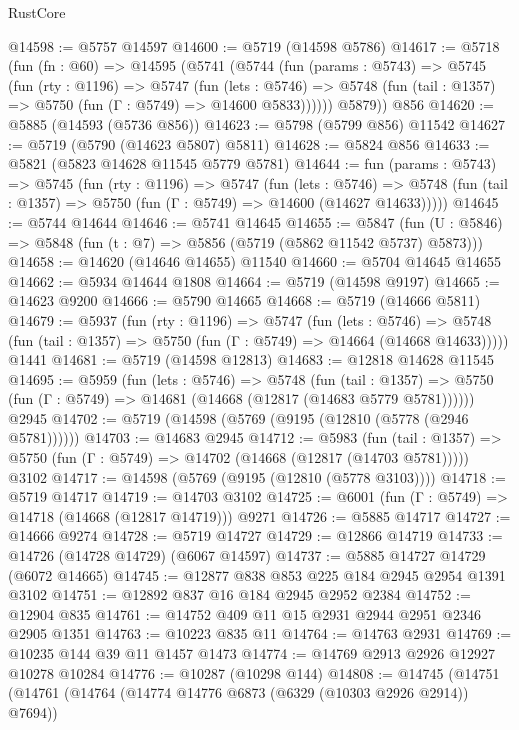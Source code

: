 \begin{lexlean}{RustCore}
\begin{coremodule}
@14598 := @5757 @14597
@14600 := @5719 (@14598 @5786)
@14617 := @5718
    (fun (fn : @60) =>
    @14595
      (@5741
        (@5744
          (fun (params : @5743) =>
          @5745
            (fun (rty : @1196) =>
            @5747
              (fun (lets : @5746) =>
              @5748 (fun (tail : @1357) => @5750 (fun (Γ : @5749) => @14600 @5833))))))
        @5879))
    @856
@14620 := @5885 (@14593 (@5736 @856))
@14623 := @5798 (@5799 @856) @11542
@14627 := @5719 (@5790 (@14623 @5807) @5811)
@14628 := @5824 @856
@14633 := @5821 (@5823 @14628 @11545 @5779 @5781)
@14644 := fun (params : @5743) =>
  @5745
    (fun (rty : @1196) =>
    @5747
      (fun (lets : @5746) =>
      @5748 (fun (tail : @1357) => @5750 (fun (Γ : @5749) => @14600 (@14627 @14633)))))
@14645 := @5744 @14644
@14646 := @5741 @14645
@14655 := @5847
    (fun (U : @5846) => @5848 (fun (t : @7) => @5856 (@5719 (@5862 @11542 @5737) @5873)))
@14658 := @14620 (@14646 @14655) @11540
@14660 := @5704 @14645 @14655
@14662 := @5934 @14644 @1808
@14664 := @5719 (@14598 @9197)
@14665 := @14623 @9200
@14666 := @5790 @14665
@14668 := @5719 (@14666 @5811)
@14679 := @5937
    (fun (rty : @1196) =>
    @5747
      (fun (lets : @5746) =>
      @5748 (fun (tail : @1357) => @5750 (fun (Γ : @5749) => @14664 (@14668 @14633)))))
    @1441
@14681 := @5719 (@14598 @12813)
@14683 := @12818 @14628 @11545
@14695 := @5959
    (fun (lets : @5746) =>
    @5748
      (fun (tail : @1357) =>
      @5750 (fun (Γ : @5749) => @14681 (@14668 (@12817 (@14683 @5779 @5781))))))
    @2945
@14702 := @5719 (@14598 (@5769 (@9195 (@12810 (@5778 (@2946 @5781))))))
@14703 := @14683 @2945
@14712 := @5983
    (fun (tail : @1357) => @5750 (fun (Γ : @5749) => @14702 (@14668 (@12817 (@14703 @5781)))))
    @3102
@14717 := @14598 (@5769 (@9195 (@12810 (@5778 @3103))))
@14718 := @5719 @14717
@14719 := @14703 @3102
@14725 := @6001 (fun (Γ : @5749) => @14718 (@14668 (@12817 @14719))) @9271
@14726 := @5885 @14717
@14727 := @14666 @9274
@14728 := @5719 @14727
@14729 := @12866 @14719
@14733 := @14726 (@14728 @14729) (@6067 @14597)
@14737 := @5885 @14727 @14729 (@6072 @14665)
@14745 := @12877 @838 @853 @225 @184 @2945 @2954 @1391 @3102
@14751 := @12892 @837 @16 @184 @2945 @2952 @2384
@14752 := @12904 @835
@14761 := @14752 @409 @11 @15 @2931 @2944 @2951 @2346 @2905 @1351
@14763 := @10223 @835 @11
@14764 := @14763 @2931
@14769 := @10235 @144 @39 @11 @1457 @1473
@14774 := @14769 @2913 @2926 @12927 @10278 @10284
@14776 := @10287 (@10298 @144)
@14808 := @14745
    (@14751
      (@14761
        (@14764 (@14774 @14776 @6873 (@6329 (@10303 @2926 @2914)) @7694))

\end{coremodule}
\end{lexlean}
